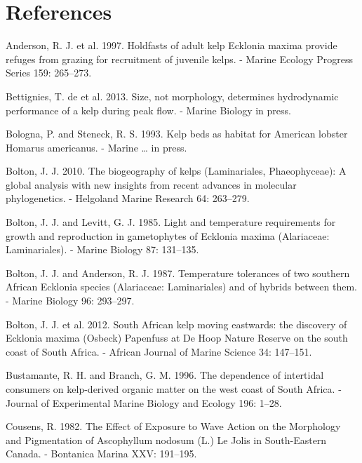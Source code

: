 \documentclass[10pt,a4,]{article}
\begin{document}
\hypertarget{references}{%
\section*{References}\label{references}}

\hypertarget{refs}{}
\leavevmode\hypertarget{ref-Anderson1997}{}%
Anderson, R. J. et al. 1997. Holdfasts of adult kelp Ecklonia maxima
provide refuges from grazing for recruitment of juvenile kelps. - Marine
Ecology Progress Series 159: 265--273.

\leavevmode\hypertarget{ref-DeBettignies2013}{}%
Bettignies, T. de et al. 2013. Size, not morphology, determines
hydrodynamic performance of a kelp during peak flow. - Marine Biology in
press.

\leavevmode\hypertarget{ref-Bologna1993}{}%
Bologna, P. and Steneck, R. S. 1993. Kelp beds as habitat for American
lobster Homarus americanus. - Marine \ldots{} in press.

\leavevmode\hypertarget{ref-Bolton2010}{}%
Bolton, J. J. 2010. The biogeography of kelps (Laminariales,
Phaeophyceae): A global analysis with new insights from recent advances
in molecular phylogenetics. - Helgoland Marine Research 64: 263--279.

\leavevmode\hypertarget{ref-Bolton1985a}{}%
Bolton, J. J. and Levitt, G. J. 1985. Light and temperature requirements
for growth and reproduction in gametophytes of Ecklonia maxima
(Alariaceae: Laminariales). - Marine Biology 87: 131--135.

\leavevmode\hypertarget{ref-Bolton1987}{}%
Bolton, J. J. and Anderson, R. J. 1987. Temperature tolerances of two
southern African Ecklonia species (Alariaceae: Laminariales) and of
hybrids between them. - Marine Biology 96: 293--297.

\leavevmode\hypertarget{ref-Bolton2012}{}%
Bolton, J. J. et al. 2012. South African kelp moving eastwards: the
discovery of Ecklonia maxima (Osbeck) Papenfuss at De Hoop Nature
Reserve on the south coast of South Africa. - African Journal of Marine
Science 34: 147--151.

\leavevmode\hypertarget{ref-Bustamante1996}{}%
Bustamante, R. H. and Branch, G. M. 1996. The dependence of intertidal
consumers on kelp-derived organic matter on the west coast of South
Africa. - Journal of Experimental Marine Biology and Ecology 196: 1--28.

\leavevmode\hypertarget{ref-Cousens1982}{}%
Cousens, R. 1982. The Effect of Exposure to Wave Action on the
Morphology and Pigmentation of Ascophyllum nodosum (L.) Le Jolis in
South-Eastern Canada. - Bontanica Marina XXV: 191--195.
\end{document}
